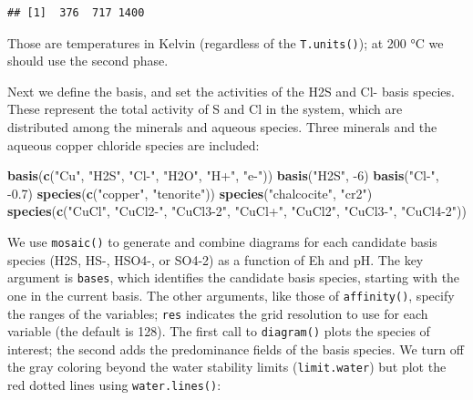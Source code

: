 \documentclass[]{tufte-book}
\newenvironment{Shaded}{}{}
\newcommand{\KeywordTok}[1]{\textcolor[rgb]{0.00,0.44,0.13}{\textbf{#1}}}
\newcommand{\DecValTok}[1]{\textcolor[rgb]{0.25,0.63,0.44}{#1}}
\newcommand{\FloatTok}[1]{\textcolor[rgb]{0.25,0.63,0.44}{#1}}
\newcommand{\StringTok}[1]{\textcolor[rgb]{0.25,0.44,0.63}{#1}}
\newcommand{\OperatorTok}[1]{\textcolor[rgb]{0.40,0.40,0.40}{#1}}
\newcommand{\NormalTok}[1]{#1}
\begin{document}
\begin{verbatim}
## [1]  376  717 1400
\end{verbatim}

Those are temperatures in Kelvin (regardless of the
{\texttt{T.units()}}); at 200 °C we should use the second phase.

Next we define the basis, and set the activities of the H2S and Cl-
basis species. These represent the total activity of S and Cl in the
system, which are distributed among the minerals and aqueous species.
Three minerals and the aqueous copper chloride species are included:

\begin{Shaded}
\begin{Highlighting}[]
\KeywordTok{basis}\NormalTok{(}\KeywordTok{c}\NormalTok{(}\StringTok{"Cu"}\NormalTok{, }\StringTok{"H2S"}\NormalTok{, }\StringTok{"Cl-"}\NormalTok{, }\StringTok{"H2O"}\NormalTok{, }\StringTok{"H+"}\NormalTok{, }\StringTok{"e-"}\NormalTok{))}
\KeywordTok{basis}\NormalTok{(}\StringTok{"H2S"}\NormalTok{, }\OperatorTok{-}\DecValTok{6}\NormalTok{)}
\KeywordTok{basis}\NormalTok{(}\StringTok{"Cl-"}\NormalTok{, }\OperatorTok{-}\FloatTok{0.7}\NormalTok{)}
\KeywordTok{species}\NormalTok{(}\KeywordTok{c}\NormalTok{(}\StringTok{"copper"}\NormalTok{, }\StringTok{"tenorite"}\NormalTok{))}
\KeywordTok{species}\NormalTok{(}\StringTok{"chalcocite"}\NormalTok{, }\StringTok{"cr2"}\NormalTok{)}
\KeywordTok{species}\NormalTok{(}\KeywordTok{c}\NormalTok{(}\StringTok{"CuCl"}\NormalTok{, }\StringTok{"CuCl2-"}\NormalTok{, }\StringTok{"CuCl3-2"}\NormalTok{, }\StringTok{"CuCl+"}\NormalTok{, }\StringTok{"CuCl2"}\NormalTok{, }\StringTok{"CuCl3-"}\NormalTok{, }\StringTok{"CuCl4-2"}\NormalTok{))}
\end{Highlighting}
\end{Shaded}

We use {\texttt{mosaic()}} to generate and combine diagrams for each
candidate basis species (H2S, HS-, HSO4-, or SO4-2) as a function of Eh
and pH. The key argument is \texttt{bases}, which identifies the
candidate basis species, starting with the one in the current basis. The
other arguments, like those of {\texttt{affinity()}}, specify the ranges
of the variables; \texttt{res} indicates the grid resolution to use for
each variable (the default is 128). The first call to
{\texttt{diagram()}} plots the species of interest; the second adds the
predominance fields of the basis species. We turn off the gray coloring
beyond the water stability limits (\texttt{limit.water}) but plot the
red dotted lines using {\texttt{water.lines()}}:
\end{document}
